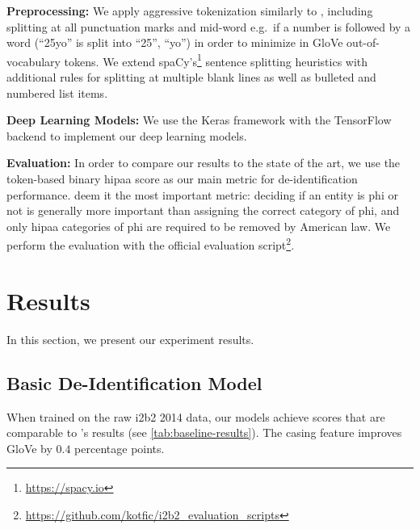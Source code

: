 \textbf{Preprocessing:}
%
We apply aggressive tokenization similarly to \citet{liu2017identification}, including splitting at all punctuation marks and mid-word e.g.\ if a number is followed by a word (``25yo'' is split into ``25'', ``yo'') in order to minimize in GloVe out-of-vocabulary tokens.
%
We extend spaCy's\footnote{\url{https://spacy.io}} sentence splitting heuristics with additional rules for splitting at multiple blank lines as well as bulleted and numbered list items.

\textbf{Deep Learning Models:}
%
We use the Keras framework \citep{chollet2015keras} with the TensorFlow backend \citep{abadi2015tensorflow} to implement our deep learning models.
%

\textbf{Evaluation:}
%
In order to compare our results to the state of the art, we use the token-based binary \ac{hipaa} \fone score as our main metric for de-identification performance.
%
\citet{dernoncourt2017identification} deem it the most important metric: deciding if an entity is \ac{phi} or not is generally more important than assigning the correct category of \ac{phi}, and only \ac{hipaa} categories of \ac{phi} are required to be removed by American law.
%
We perform the evaluation with the official evaluation script\footnote{\url{https://github.com/kotfic/i2b2\_evaluation\_scripts}}.

\section{Results}
%
In this section, we present our experiment results.

\subsection{Basic De-Identification Model}
%
When trained on the raw i2b2 2014 data, our models achieve \fone scores that are comparable to \citeauthor{dernoncourt2017identification}'s results (see \cref{tab:baseline-results}).
%
The casing feature improves GloVe by $0.4$ percentage points.

